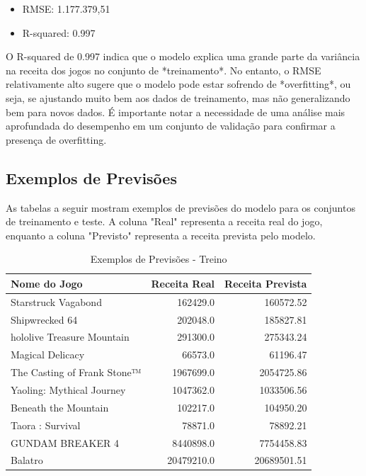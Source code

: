 \documentclass[12pt]{article}
\begin{document}
\begin{itemize}
\item RMSE: 1.177.379,51
\item R-squared: 0.997
\end{itemize}

O R-squared de 0.997 indica que o modelo explica uma grande parte da variância na receita dos jogos no conjunto de *treinamento*. No entanto, o RMSE relativamente alto sugere que o modelo pode estar sofrendo de *overfitting*, ou seja, se ajustando muito bem aos dados de treinamento, mas não generalizando bem para novos dados.  É importante notar a necessidade de uma análise mais aprofundada do desempenho em um conjunto de validação para confirmar a presença de overfitting.

\subsection{Exemplos de Previsões}

As tabelas a seguir mostram exemplos de previsões do modelo para os conjuntos de treinamento e teste.  A coluna "Real" representa a receita real do jogo, enquanto a coluna "Previsto" representa a receita prevista pelo modelo.

\begin{table} %
\centering  %
\caption{Exemplos de Previsões - Treino} %
\begin{tabular}{lrr} %
\toprule  %
Nome do Jogo & Receita Real & Receita Prevista \\ %
\midrule  %
        Starstruck Vagabond &   162429.0 &   160572.52 \\
             Shipwrecked 64 &   202048.0 &   185827.81\\
 hololive Treasure Mountain &   291300.0 &   275343.24\\
           Magical Delicacy &    66573.0 &    61196.47\\
The Casting of Frank Stone™ &  1967699.0 &  2054725.86\\
  Yaoling: Mythical Journey &  1047362.0 &  1033506.56\\
       Beneath the Mountain &   102217.0 &   104950.20\\
           Taora : Survival &    78871.0 &    78892.21\\
           GUNDAM BREAKER 4 &  8440898.0 &  7754458.83\\
                    Balatro & 20479210.0 & 20689501.51\\
\bottomrule  %
\end{tabular}
\end{table}
\end{document}
